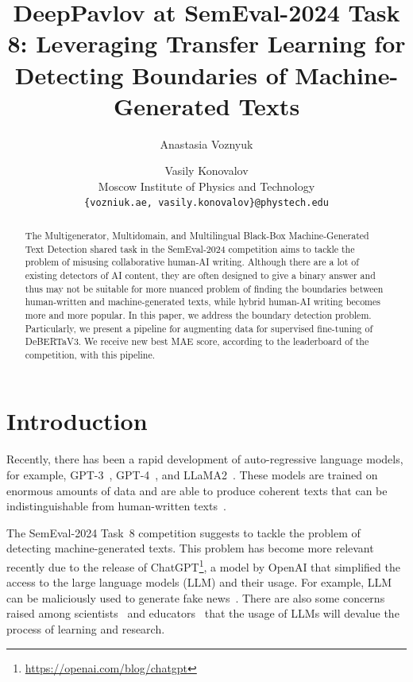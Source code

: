 \documentclass[11pt]{article}
\title{DeepPavlov at SemEval-2024 Task 8: Leveraging Transfer Learning for Detecting Boundaries of Machine-Generated Texts}
\author{Anastasia Voznyuk \and Vasily Konovalov \\
 Moscow Institute of Physics and Technology\\
  \texttt{\{vozniuk.ae, vasily.konovalov\}@phystech.edu}\\
 }
\begin{document}
\maketitle
\begin{abstract}
The Multigenerator, Multidomain, and Multilingual Black-Box Machine-Generated Text Detection shared task in the SemEval-2024 competition aims to tackle the problem of misusing collaborative human-AI writing. Although there are a lot of existing detectors of AI content, they are often designed to give a binary answer and thus may not be suitable for more nuanced problem of finding the boundaries between human-written and machine-generated texts, while hybrid human-AI writing becomes more and more popular. In this paper, we address the boundary detection problem. Particularly, we present a pipeline for augmenting data for supervised fine-tuning of DeBERTaV3. We receive new best MAE score, according to the leaderboard of the competition, with this pipeline.
\end{abstract}
\section{Introduction}

Recently, there has been a rapid development of auto-regressive language models, for example, GPT-3~\cite{gpt3}, GPT-4~\cite{openai2023gpt4}, and LLaMA2~\cite{touvron2023llama2}. These models are trained on enormous amounts of data and are able to produce coherent texts that can be indistinguishable from human-written texts~\cite{dugan2022real}.

The SemEval-2024 Task~8 competition suggests to tackle the problem of detecting machine-generated texts. This problem has become more relevant recently due to the release of ChatGPT\footnote{\url{https://openai.com/blog/chatgpt}}, a model by OpenAI that simplified the access to the large language models (LLM) and their usage. For example, LLM can be maliciously used to generate fake news~\cite{zellers2020defending}. There are also some concerns raised among scientists~\cite{ma2023ai} and educators~\cite{zeng2023automatic} that the usage of LLMs will devalue the process of learning and research.
\end{document}
